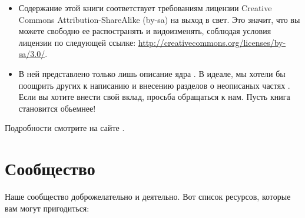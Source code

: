 \documentclass[a4paper,10pt,twoside]{book}
\begin{document}
\begin{itemize}


\item	Содержание этой книги соответствует требованиям лицензии Creative Commons Attribution-ShareAlike (by-sa) на выход в свет.
		Это значит, что вы можете свободно ее распостранять и видоизменять, соблюдая условия лицензии по следующей ссылке: \url{http://creativecommons.org/licenses/by-sa/3.0/}.

	
\item	В ней представлено только лишь описание ядра \pharo.
		В идеале, мы хотели бы поощрить других к написанию и внесению разделов о неописаных частях \pharo.
		Если вы хотите внести свой вклад, просьба обращаться к нам. Пусть книга становится обьемнее!
\end{itemize}

Подробности смотрите на сайте \pbe.

\section*{Сообщество \pharo}


Наше сообщество доброжелательно и деятельно.
Вот список ресурсов, которые вам могут пригодиться:
\end{document}
